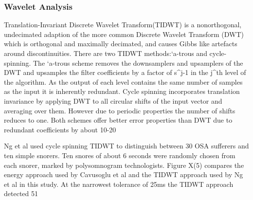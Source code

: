 \subsubsection{Wavelet Analysis}
Translation-Invariant Discrete Wavelet Transform(TIDWT) is a nonorthogonal, undecimated adaption of the more common Discrete Wavelet Transform (DWT) which is orthogonal and maximally decimated, and causes Gibbs like artefacts around discontinuities. There are two TIDWT methods:`a-trous and cycle-spinning. The `a-trous scheme removes the downsamplers and upsamplers of the DWT and upsamples the filter coefficients by a factor of s^{j-1} in the j^{th} level of the algorithm. As the output of each level contains the same number of samples as the input it is inherently redundant. 
Cycle spinning incorporates translation invariance by applying DWT to all circular shifts of the input vector and averaging over them. However due to periodic properties the number of shifts reduces to one. Both schemes offer better error properties than DWT due to redundant coefficients by about 10-20%

Ng et al used cycle spinning TIDWT to distinguish between 30 OSA sufferers and ten simple snorers. Ten snores of about 6 seconds were randomly chosen from each snorer, marked by polysomnogram technologists. Figure X(5) compares the energy approach used by Cavusoglu et al and the TIDWT approach used by Ng et al in this study. At the narrowest tolerance of 25ms the TIDWT approach detected 51%


